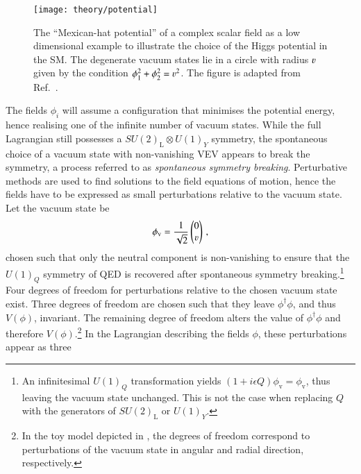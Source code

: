 \begin{figure}[htbp]
  \centering

  \texttt{[image: theory/potential]}

  \caption[The ``Mexican-hat potential'' of a complex scalar field.]{The
    ``Mexican-hat potential'' of a complex scalar field as a low dimensional
    example to illustrate the choice of the Higgs potential in the SM. The
    degenerate vacuum states lie in a circle with radius $\varv$ given by the
    condition $\phi_1^2 + \phi_2^2 = \varv^2$. The figure is adapted from
    Ref.~\cite{higgs_potential_tikz}.}%
  \label{fig:mexican_hat}
\end{figure}

The fields $\phi_i$ will assume a configuration that minimises the potential
energy, hence realising one of the infinite number of vacuum states. While the
full Lagrangian still possesses a $SU(2)_{\text{L}} \otimes U(1)_Y$ symmetry,
the spontaneous choice of a vacuum state with non-vanishing VEV appears to break
the symmetry, a process referred to as \emph{spontaneous symmetry
  breaking}. Perturbative methods are used to find solutions to the field
equations of motion, hence the fields have to be expressed as small
perturbations relative to the vacuum state. Let the vacuum state be
\begin{align*}
  \phi_{\text{v}} = \frac{1}{\sqrt{2}}
  \begin{pmatrix}
    0 \\
    \varv
  \end{pmatrix} \,\text{,}
\end{align*}
chosen such that only the neutral component is non-vanishing to ensure that the
$U(1)_Q$ symmetry of QED is recovered after spontaneous symmetry
breaking.\footnote{An infinitesimal $U(1)_Q$ transformation yields
  $(1 + i \epsilon Q) \phi_{\text{v}} = \phi_{\text{v}}$, thus leaving the
  vacuum state unchanged. This is not the case when replacing $Q$ with the
  generators of $SU(2)_{\text{L}}$ or $U(1)_Y$.} Four degrees of freedom for
perturbations relative to the chosen vacuum state exist. Three degrees of
freedom are chosen such that they leave $\phi^\dagger \phi$, and thus $V(\phi)$,
invariant. The remaining degree of freedom alters the value of
$\phi^\dagger \phi$ and therefore $V(\phi)$.\footnote{In the toy model depicted
  in , the degrees of freedom correspond to perturbations
  of the vacuum state in angular and radial direction, respectively.} In the
Lagrangian describing the fields $\phi$, these perturbations appear as three
